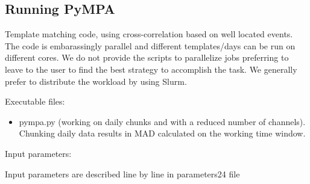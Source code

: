 \documentclass[a4paper,10pt,english]{sphinxmanual}
\begin{document}
\subsection{Running PyMPA}
\label{\detokenize{tutorial:running-pympa}}
Template matching code, using cross-correlation based on well located events. The code is embarassingly parallel and different templates/days can be run on different cores. We do not provide the scripts to parallelize jobs preferring to leave to the user to find the best strategy to accomplish the task. We generally prefer to distribute the workload by using Slurm.

Executable files:
\begin{itemize}
\item {} 
pympa.py (working on daily chunks and with a reduced number of channels). Chunking daily data results in MAD calculated on the working time window.

\end{itemize}

Input parameters:

Input parameters are described line by line in parameters24 file
\end{document}
